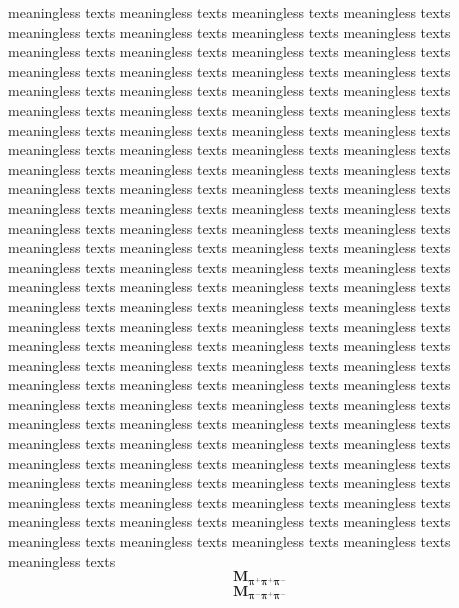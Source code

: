\documentclass[12pt, twoside, notitlepage, twocolumn]{article}
\begin{document}
    meaningless texts meaningless texts meaningless texts meaningless texts meaningless texts 
    meaningless texts meaningless texts meaningless texts meaningless texts meaningless texts 
    meaningless texts meaningless texts meaningless texts meaningless texts meaningless texts 
    meaningless texts meaningless texts meaningless texts meaningless texts meaningless texts 
    meaningless texts meaningless texts meaningless texts meaningless texts meaningless texts 
    meaningless texts meaningless texts meaningless texts meaningless texts meaningless texts 
    meaningless texts meaningless texts meaningless texts meaningless texts meaningless texts 
    meaningless texts meaningless texts meaningless texts meaningless texts meaningless texts 
    meaningless texts meaningless texts meaningless texts meaningless texts meaningless texts 
    meaningless texts meaningless texts meaningless texts meaningless texts meaningless texts 
    meaningless texts meaningless texts meaningless texts meaningless texts meaningless texts 
    meaningless texts meaningless texts meaningless texts meaningless texts meaningless texts
    meaningless texts meaningless texts meaningless texts meaningless texts meaningless texts 
    meaningless texts meaningless texts meaningless texts meaningless texts meaningless texts 
    meaningless texts meaningless texts meaningless texts meaningless texts meaningless texts 
    meaningless texts meaningless texts meaningless texts meaningless texts meaningless texts 
    meaningless texts meaningless texts meaningless texts meaningless texts meaningless texts 
    meaningless texts meaningless texts meaningless texts meaningless texts meaningless texts 
    meaningless texts meaningless texts meaningless texts meaningless texts meaningless texts 
    meaningless texts meaningless texts meaningless texts meaningless texts meaningless texts 
    meaningless texts meaningless texts meaningless texts meaningless texts meaningless texts 
    meaningless texts meaningless texts meaningless texts meaningless texts meaningless texts 
    meaningless texts meaningless texts meaningless texts
    $$\bm{M_{\pi^+\pi^+\pi^-}}$$
    $$\bm{M_{\pi^-\pi^+\pi^-}}$$
    


\end{document}
